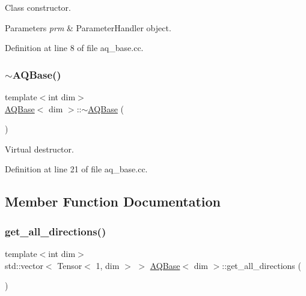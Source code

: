 Class constructor.


\begin{DoxyParams}{Parameters}
{\em prm} & Parameter\+Handler object. \\
\hline
\end{DoxyParams}


Definition at line 8 of file aq\+\_\+base.\+cc.

\mbox{\label{class_a_q_base_ab394068aae3c9b3f3932c3bfa3edceab}} 
\subsubsection{\texorpdfstring{$\sim$\+A\+Q\+Base()}{~AQBase()}}
{\footnotesize\ttfamily template$<$int dim$>$ \\
\hyperlink{class_a_q_base}{A\+Q\+Base}$<$ dim $>$\+::$\sim$\hyperlink{class_a_q_base}{A\+Q\+Base} (\begin{DoxyParamCaption}{ }\end{DoxyParamCaption})\hspace{0.3cm}{\ttfamily [virtual]}}



Virtual destructor. 



Definition at line 21 of file aq\+\_\+base.\+cc.



\subsection{Member Function Documentation}
\mbox{\label{class_a_q_base_ac2e0120510426f0b1dded2d5b546038b}} 
\subsubsection{\texorpdfstring{get\+\_\+all\+\_\+directions()}{get\_all\_directions()}}
{\footnotesize\ttfamily template$<$int dim$>$ \\
std\+::vector$<$ Tensor$<$ 1, dim $>$ $>$ \hyperlink{class_a_q_base}{A\+Q\+Base}$<$ dim $>$\+::get\+\_\+all\+\_\+directions (\begin{DoxyParamCaption}{ }\end{DoxyParamCaption})}



